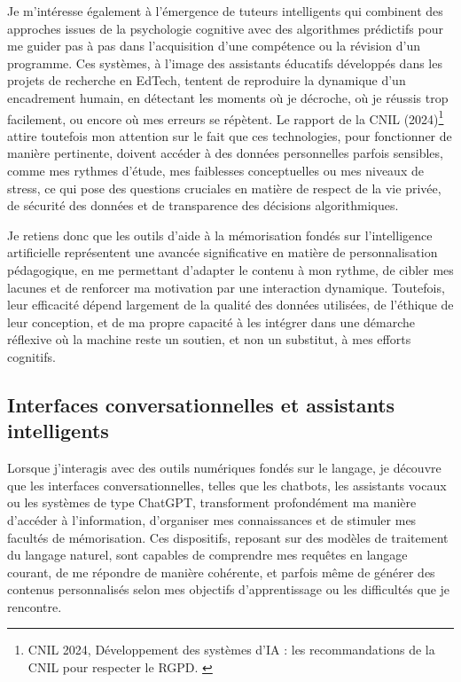 \documentclass[11pt,a4paper]{report}
\begin{document}
Je m’intéresse également à l’émergence de tuteurs intelligents qui combinent des approches issues de la psychologie cognitive avec des algorithmes prédictifs pour me guider pas à pas dans l’acquisition d’une compétence ou la révision d’un programme. Ces systèmes, à l’image des assistants éducatifs développés dans les projets de recherche en EdTech, tentent de reproduire la dynamique d’un encadrement humain, en détectant les moments où je décroche, où je réussis trop facilement, ou encore où mes erreurs se répètent. Le rapport de la CNIL (2024)\footnote{CNIL 2024, Développement des systèmes d’IA : les recommandations de la CNIL pour respecter le RGPD. \cite{cnil}} attire toutefois mon attention sur le fait que ces technologies, pour fonctionner de manière pertinente, doivent accéder à des données personnelles parfois sensibles, comme mes rythmes d’étude, mes faiblesses conceptuelles ou mes niveaux de stress, ce qui pose des questions cruciales en matière de respect de la vie privée, de sécurité des données et de transparence des décisions algorithmiques.

Je retiens donc que les outils d’aide à la mémorisation fondés sur l’intelligence artificielle représentent une avancée significative en matière de personnalisation pédagogique, en me permettant d’adapter le contenu à mon rythme, de cibler mes lacunes et de renforcer ma motivation par une interaction dynamique. Toutefois, leur efficacité dépend largement de la qualité des données utilisées, de l’éthique de leur conception, et de ma propre capacité à les intégrer dans une démarche réflexive où la machine reste un soutien, et non un substitut, à mes efforts cognitifs.

\subsection{Interfaces conversationnelles et assistants intelligents}

Lorsque j’interagis avec des outils numériques fondés sur le langage, je découvre que les interfaces conversationnelles, telles que les chatbots, les assistants vocaux ou les systèmes de type ChatGPT, transforment profondément ma manière d’accéder à l’information, d’organiser mes connaissances et de stimuler mes facultés de mémorisation. Ces dispositifs, reposant sur des modèles de traitement du langage naturel, sont capables de comprendre mes requêtes en langage courant, de me répondre de manière cohérente, et parfois même de générer des contenus personnalisés selon mes objectifs d’apprentissage ou les difficultés que je rencontre.
\end{document}
